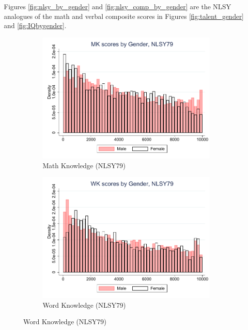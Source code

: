 \documentclass[onehalfspacing,11pt]{article}
\begin{document}
	Figures \ref{fig:nlsy_by_gender} and \ref{fig:nlsy_comp_by_gender} are the NLSY analogues of the math and verbal composite scores in Figures \ref{fig:talent_gender} and \ref{fig:IQbygender}.
	
	\begin{figure}
		\begin{subfigure}{0.49\textwidth}
			\includegraphics[width=\linewidth]{NLSY79_MK_gender.pdf}
			\caption{Math Knowledge (NLSY79)} \label{fig:nlsy79math}
		\end{subfigure}
		\hspace*{\fill} %
		\begin{subfigure}{0.49\textwidth}
			\includegraphics[width=\linewidth]{NLSY79_WK_gender.pdf}
			\caption{Word Knowledge (NLSY79)} \label{fig:nlsy79word}

\end{subfigure}
\end{figure}
\end{document}
